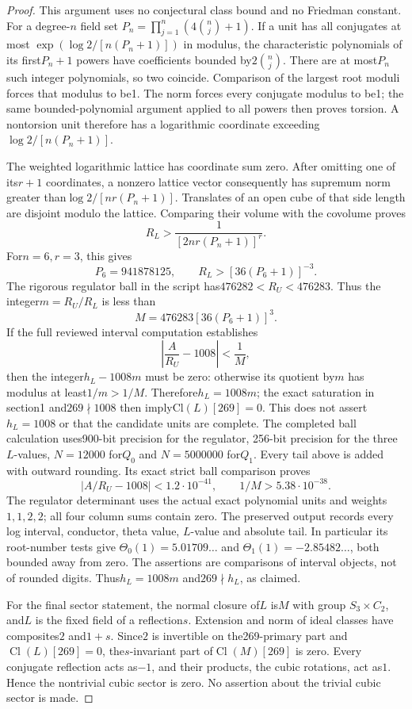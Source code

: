 \begin{proof}
This argument uses no conjectural class bound and no Friedman constant.
For a degree-$n$ field set
$P_n=\prod_{j=1}^n(4\binom nj+1)$.
If a unit has all conjugates at most
$\exp(\log2/[n(P_n+1)])$ in modulus, the characteristic polynomials
of its first$P_n+1$ powers have coefficients bounded by$2\binom nj$.
There are at most$P_n$ such integer polynomials, so two coincide.
Comparison of the largest root moduli forces that modulus to be1.
The norm forces every conjugate modulus to be1; the same bounded-polynomial
argument applied to all powers then proves torsion.
A nontorsion unit therefore has a logarithmic coordinate exceeding
$\log2/[n(P_n+1)]$.

The weighted logarithmic lattice has coordinate sum zero.  After omitting
one of its$r+1$ coordinates, a nonzero lattice vector consequently has
supremum norm greater than$\log2/[nr(P_n+1)]$.
Translates of an open cube of that side length are disjoint modulo the
lattice.  Comparing their volume with the covolume proves
\[
                    R_L>\frac1{[2nr(P_n+1)]^r}.
\]
For$n=6,r=3$, this gives
\[
 P_6=941878125,\qquad
 R_L> [36(P_6+1)]^{-3}.
\]
The rigorous regulator ball in the script has$476282<R_U<476283$.
Thus the integer$m=R_U/R_L$ is less than
\[
                      M=476283[36(P_6+1)]^3.
\]
If the full reviewed interval computation establishes
\[
                     \left|\frac A{R_U}-1008\right|<\frac1M,
\]
then the integer$h_L-1008m$ must be zero: otherwise its quotient by$m$
has modulus at least$1/m>1/M$.
Therefore$h_L=1008m$; the exact saturation in section1 and$269\nmid1008$
then imply$\mathrm{Cl}(L)[269]=0$.
This does not assert$h_L=1008$ or that the candidate units are complete.
The completed ball calculation uses900-bit precision for the regulator,
256-bit precision for the three $L$-values, $N=12000$ for$Q_0$ and
$N=5000000$ for$Q_1$.  Every tail above is added with outward rounding.
Its exact strict ball comparison proves
\[
 \left|A/R_U-1008\right|<1.2\cdot10^{-41},
 \qquad 1/M>5.38\cdot10^{-38}.
\]
The regulator determinant uses the actual exact polynomial units and
weights$1,1,2,2$; all four column sums contain zero.
The preserved output records every log interval, conductor, theta value,
$L$-value and absolute tail.  In particular its root-number tests give
$\Theta_0(1)=5.01709\ldots$ and
$\Theta_1(1)=-2.85482\ldots$, both bounded away from zero.
The assertions are comparisons of interval objects, not of rounded digits.
Thus$h_L=1008m$ and$269\nmid h_L$, as claimed.

For the final sector statement, the normal closure of$L$ is$M$ with group
$S_3\times C_2$, and$L$ is the fixed field of a reflection$s$.
Extension and norm of ideal classes have composites$2$ and$1+s$.
Since$2$ is invertible on the269-primary part and$\operatorname{Cl}(L)[269]=0$,
the$s$-invariant part of$\operatorname{Cl}(M)[269]$ is zero.
Every conjugate reflection acts as$-1$, and their products, the cubic
rotations, act as$1$.  Hence the nontrivial cubic sector is zero.
No assertion about the trivial cubic sector is made.
\end{proof}

